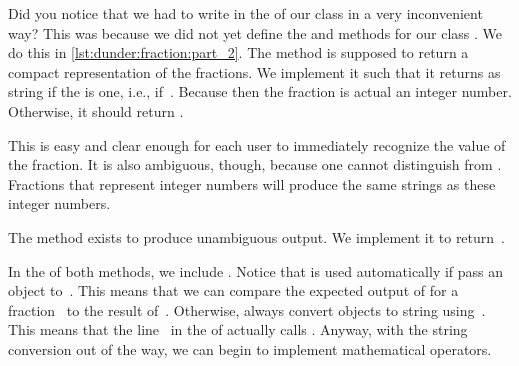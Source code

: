 %
\afterpage{\clearpage}

Did you notice that we had to write  in the  of our class in a very inconvenient way?
This was because we did not yet define the  and  methods for our class .
We do this in \cref{lst:dunder:fraction:part_2}.
The method  is supposed to return a compact representation of the fractions.
We implement it such that it returns  as string if the  is one, i.e., if~.
Because then the fraction is actual an integer number.
Otherwise, it should return .

This is easy and clear enough for each user to immediately recognize the value of the fraction.
It is also ambiguous, though, because one cannot distinguish  from .
Fractions that represent integer numbers will produce the same strings as these integer numbers.%
%
\begin{sloppypar}%
The  method exists to produce unambiguous output.
We implement it to return~.%
\end{sloppypar}%
%
In the  of both methods, we include .
Notice that  is used automatically if pass an object to~.
This means that we can compare the expected output of  for a fraction~ to the result of~.
Otherwise,  always convert objects to string using~.
This means that the line~ in the  of  actually calls .
Anyway, with the string conversion out of the way, we can begin to implement mathematical operators.

%
%
%
%
%
%
\afterpage{\clearpage}

